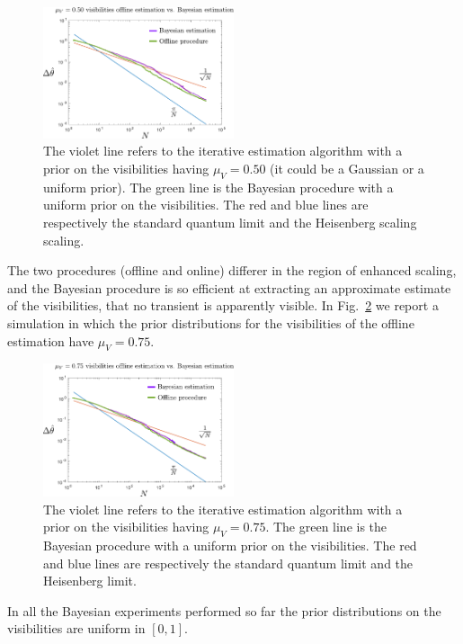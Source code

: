 \documentclass[aps, pra, 10pt, twocolumn, superscriptaddress,floatfix]{revtex4-1}
\begin{document}
\begin{figure}[!t]
	\begin{center}
		\includegraphics[width=0.5\textwidth]{050vis.pdf}
	\end{center}
	\caption{The violet line refers to the iterative estimation algorithm with a prior on the visibilities having $\mu_V = 0.50$ (it could be a Gaussian or a uniform prior). The green line is the Bayesian procedure with a uniform prior on the visibilities. The red and blue lines are respectively the standard quantum limit and the Heisenberg scaling scaling.}
	\label{fig:050vis}
\end{figure}
%
The two procedures (offline and online) differer in the region of enhanced scaling, and the Bayesian procedure is so efficient at extracting an approximate estimate of the visibilities, that no transient is apparently visible. In Fig.~\ref{fig:075vis} we report a simulation in which the prior distributions for the visibilities of the offline estimation have $\mu_V = 0.75$.
%
\begin{figure}[!t]
	\begin{center}
		\includegraphics[width=0.5\textwidth]{075vis.pdf}
	\end{center}
	\caption{The violet line refers to the iterative estimation algorithm with a prior on the visibilities having $\mu_V = 0.75$. The green line is the Bayesian procedure with a uniform prior on the visibilities. The red and blue lines are respectively the standard quantum limit and the Heisenberg limit.}
	\label{fig:075vis}
\end{figure}
%
In all the Bayesian experiments performed so far the prior distributions on the visibilities are uniform in $[0, 1]$.
\end{document}
